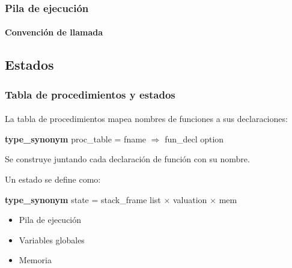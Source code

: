 \begin{frame}[fragile]
\frametitle{Pila de ejecución}
\framesubtitle{Convención de llamada}


\begin{semiverbatim}
\end{semiverbatim}


\end{frame}

\subsection{Estados}

\begin{frame}
\frametitle{Tabla de procedimientos y estados}
\framesubtitle{}

La tabla de procedimientos mapea nombres de funciones a sus declaraciones:
\bigskip

\textbf{type\_synonym} proc\_table = fname $\Rightarrow$ fun\_decl option
\pause
\bigskip

Se construye juntando cada declaración de función con su nombre.

\pause
\bigskip

Un estado se define como:
\bigskip
\pause

\textbf{type\_synonym} state = stack\_frame list $\times$ valuation $\times$ mem

\pause

\begin{itemize}
\item{Pila de ejecución}
\item{Variables globales}
\item{Memoria}
\end{itemize}

\end{frame}


